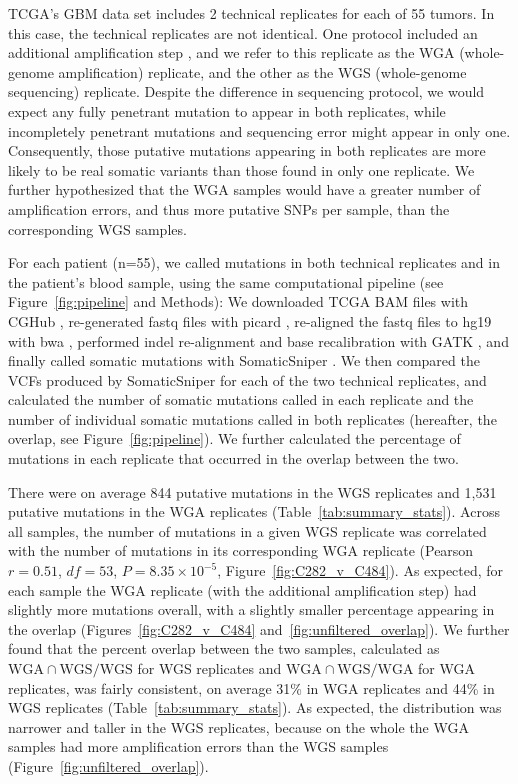 \documentclass[11pt]{article} %
\begin{document}

TCGA's GBM data set includes 2 technical replicates for each of 55 tumors. In this case, the technical replicates are not identical. One protocol included an additional amplification step \citep{TCGA-GBM}, and we refer to this replicate as the WGA (whole-genome amplification) replicate, and the other as the WGS (whole-genome sequencing) replicate. Despite the difference in sequencing protocol, we would expect any fully penetrant mutation to appear in both replicates, while incompletely penetrant mutations and sequencing error might appear in only one. Consequently, those putative mutations appearing in both replicates are more likely to be real somatic variants than those found in only one replicate. We further hypothesized that the WGA samples would have a greater number of amplification errors, and thus more putative SNPs per sample, than the corresponding WGS samples. 

For each patient (n=55), we called mutations in both technical replicates and in the patient's blood sample, using the same computational pipeline (see Figure~\ref{fig:pipeline} and Methods): We downloaded TCGA BAM files with CGHub \citep{CGHub}, re-generated fastq files with picard \citep{picard}, re-aligned the fastq files to hg19 with bwa \citep{bwa}, performed indel re-alignment and base recalibration with GATK \citep{GATK}, and finally called somatic mutations with SomaticSniper \citep{SomaticSniper}. We then compared the VCFs produced by SomaticSniper for each of the two technical replicates, and calculated the number of somatic mutations called in each replicate and the number of individual somatic mutations called in both replicates (hereafter, the overlap, see Figure~\ref{fig:pipeline}). We further calculated the percentage of mutations in each replicate that occurred in the overlap between the two. 

There were on average 844 putative mutations in the WGS replicates and 1,531 putative mutations in the WGA replicates (Table~\ref{tab:summary_stats}). Across all samples, the number of mutations in a given WGS replicate was correlated with the number of mutations in its corresponding WGA replicate (Pearson $r=0.51$, $df=53$, $P=8.35\times10^{-5}$, Figure~\ref{fig:C282_v_C484}). As expected, for each sample the WGA replicate (with the additional amplification step) had slightly more mutations overall, with a slightly smaller percentage appearing in the overlap (Figures~\ref{fig:C282_v_C484} and~\ref{fig:unfiltered_overlap}). We further found that the percent overlap between the two samples, calculated as $\text{WGA} \cap \text{WGS}/\text{WGS}$ for WGS replicates and $\text{WGA} \cap \text{WGS}/\text{WGA}$ for WGA replicates, was fairly consistent, on average 31\% in WGA replicates and 44\% in WGS replicates (Table~\ref{tab:summary_stats}). As expected, the distribution was narrower and taller in the WGS replicates, because on the whole the WGA samples had more amplification errors than the WGS samples (Figure~\ref{fig:unfiltered_overlap}).
\end{document}
